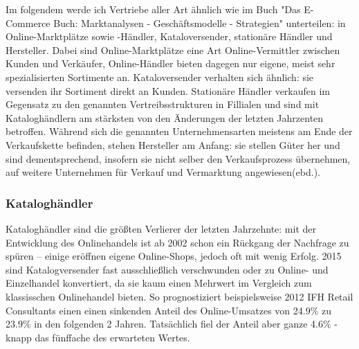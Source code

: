 \begin{folding} %

Im folgendem werde ich Vertriebe aller Art ähnlich wie im Buch "Das E-Commerce Buch: Marktanalysen - Geschäftsmodelle - Strategien" unterteilen: in Online-Marktplätze sowie -Händler, Kataloversender, stationäre Händler und Hersteller\cite[S. 15ff]{Graf}. Dabei sind Online-Marktplätze eine Art Online-Vermittler zwischen Kunden und Verkäufer, Online-Händler bieten dagegen nur eigene, meist sehr spezialisierten Sortimente an. Kataloversender verhalten sich ähnlich: sie versenden ihr Sortiment direkt an Kunden. Stationäre Händler verkaufen im Gegensatz zu den genannten Vertreibsstrukturen in Fillialen und sind mit Kataloghändlern am stärksten von den Änderungen der letzten Jahrzenten betroffen. Während sich die genannten Unternehmensarten meistens am Ende der Verkaufskette befinden, stehen Hersteller am Anfang: sie stellen Güter her und sind dementsprechend, insofern sie nicht selber den Verkaufsprozess übernehmen, auf weitere Unternehmen für Verkauf und Vermarktung angewiesen(ebd.). %

\end{folding}

\begin{folding} \subsubsection{Kataloghändler}

Kataloghändler sind die größten Verlierer der letzten Jahrzehnte: mit der Entwicklung des Onlinehandels ist ab 2002 schon ein Rückgang der Nachfrage zu spüren – einige eröffnen eigene Online-Shops\cite[S. 24f]{Graf}, jedoch oft mit wenig Erfolg\cite[S. 38]{Graf}. 2015 sind Katalogversender fast ausschließlich verschwunden oder zu Online- und Einzelhandel konvertiert, da sie kaum einen Mehrwert im Vergleich zum klassisschen Onlinehandel bieten\cite[S. 47]{Graf}. So prognostiziert beispielsweise 2012 IFH Retail Consultants einen einen sinkenden Anteil des Online-Umsatzes von 24.9\% zu 23.9\% in den folgenden 2 Jahren\cite[S. 20]{evilcom}. Tatsächlich fiel der Anteil aber ganze 4.6\% - knapp das fünffache des erwarteten Wertes\cite{statista-vertriebsformen}. %

\end{folding}

